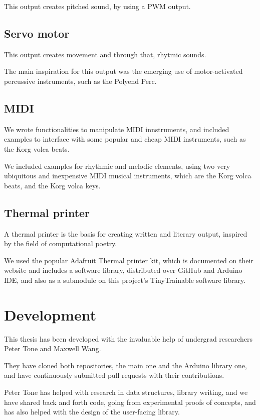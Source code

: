 This output creates pitched sound, by using a PWM output.

\subsection{Servo motor}

This output creates movement and through that, rhytmic sounds.

The main inspiration for this output was the emerging use of motor-activated percussive instruments, such as the Polyend Perc.

\subsection{MIDI}

We wrote functionalities to manipulate MIDI innstruments, and included examples to interface with some popular and cheap MIDI instruments, such as the Korg volca beats.

We included examples for rhythmic and melodic elements, using two very ubiquitous and inexpensive MIDI musical instruments, which are the Korg volca beats, and the Korg volca keys.

\subsection{Thermal printer}

A thermal printer is the basis for creating written and literary output, inspired by the field of computational poetry.

We used the popular Adafruit Thermal printer kit, which is documented on their website and includes a software library, distributed over GitHub and Arduino IDE, and also as a submodule on this project's TinyTrainable software library.

\section{Development}

This thesis has been developed with the invaluable help of undergrad researchers Peter Tone and Maxwell Wang.

They have cloned both repositories, the main one and the Arduino library one, and have continuously submitted pull requests with their contributions.

Peter Tone has helped with research in data structures, library writing, and we have shared back and forth code, going from experimental proofs of concepts, and has also helped with the design of the user-facing library.

